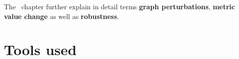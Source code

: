 The~ chapter further explain in detail terms \textbf{graph perturbations}, \textbf{metric value change} as well as \textbf{robustness}.


\section{Tools used}

